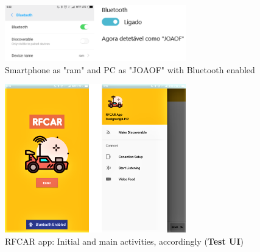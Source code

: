 \begin{figure}[!ht]
\centering
\includegraphics[width=0.7\textwidth]{img/bt_app_pc.png}
\caption{\label{fig:bt_app_pc}Smartphone as "ram" and PC as "JOAOF" with Bluetooth enabled}
\end{figure}
%
\newpage
\begin{figure}[!ht]
\centering
\includegraphics[width=0.7\textwidth]{img/bt_intro_main.png}
\caption{\label{fig:bt_intro_main}RFCAR app: Initial and main activities, accordingly (\textbf{Test UI})}
\end{figure}
%

